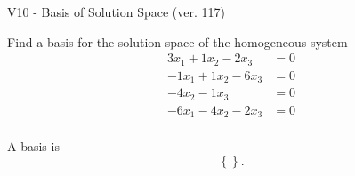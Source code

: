\begin{exercise}
  \begin{exerciseTitle}V10 - Basis of Solution Space (ver. 117)\end{exerciseTitle}
  \begin{exerciseStatement}
    Find a basis for the solution space of the homogeneous system 
\begin{align*}
 3 x_ 1 + 1 x_ 2 -2 x_ 3 &= 0  \\ 
  -1 x_ 1 + 1 x_ 2 -6 x_ 3 &= 0  \\ 
  -4 x_ 2 -1 x_ 3 &= 0  \\ 
  -6 x_ 1 -4 x_ 2 -2 x_ 3 &= 0  \\ 
 \end{align*}


 
  \end{exerciseStatement}

  \begin{exerciseAnswer}
   A basis is   
\[\left\{\right\}.\]

  


  \end{exerciseAnswer}
\end{exercise}